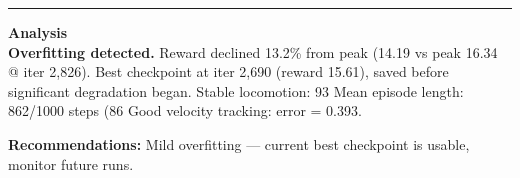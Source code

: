 \documentclass[a4paper,10pt]{article}
\begin{document}
\vspace{2pt}
\hrule
\vspace{2pt}

\footnotesize
\textbf{Analysis} \\[1pt]
\textbf{Overfitting detected.} Reward declined 13.2\% from peak (14.19 vs peak 16.34 @ iter 2,826).
Best checkpoint at iter 2,690 (reward 15.61), saved before significant degradation began.
Stable locomotion: 93%
Mean episode length: 862/1000 steps (86%
Good velocity tracking: error = 0.393.

\textbf{Recommendations:}
Mild overfitting --- current best checkpoint is usable, monitor future runs.
\end{document}
